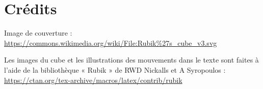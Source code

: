 \documentclass[10pt,paper=a5,pagesize]{scrbook}
\begin{document}
\chapter{Crédits}

Image de couverture : \url{https://commons.wikimedia.org/wiki/File:Rubik%27s_cube_v3.svg}

Les images du cube et les illustrations des mouvements dans le texte sont faites à l'aide
de la bibliothèque « Rubik » de RWD Nick­alls et A Sy­ropou­los : \url{https://ctan.org/tex-archive/macros/latex/contrib/rubik}
\end{document}
